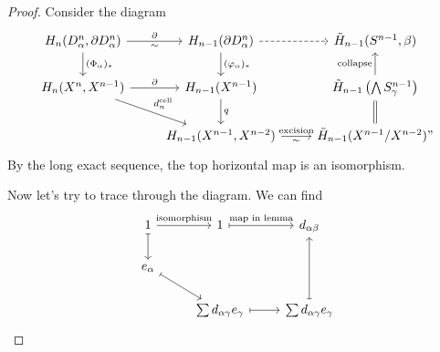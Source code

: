 \documentclass[a4paper]{article}
\begin{document}
\begin{proof}
  Consider the diagram
  \[
    \begin{tikzcd}
      H_n(D_\alpha^n, \partial D_\alpha^n) \ar[d, "(\Phi_\alpha)_*"] \ar[r, "\partial", "\sim"'] & H_{n - 1}(\partial D_\alpha^n)\ar[d, "(\varphi_\alpha)_*"] \ar[r, dashed] & \tilde{H}_{n - 1}(S^{n - 1}, \beta) \\
      H_n(X^n, X^{n - 1}) \ar[r, "\partial"] \ar[rd, "d_n^\mathrm{cell}"] & H_{n - 1}(X^{n - 1}) \ar[d, "q"] & \tilde{H}_{n - 1}\left(\bigwedge S_\gamma^{n - 1}\right)\ar[u, "\text{collapse}"]\\
      & H_{n - 1}(X^{n - 1}, X^{n - 2}) \ar[r, "\text{excision}", "\sim"'] & \tilde{H}_{n - 1}(X^{n - 1}/X^{n - 2})" \ar[u, equals]
    \end{tikzcd}
  \]
  By the long exact sequence, the top horizontal map is an isomorphism.

  Now let's try to trace through the diagram. We can find
  \[
    \begin{tikzcd}
      1 \ar[d, maps to] \ar[r, "\text{isomorphism}"] & 1 \ar[r, maps to, "\text{map in lemma}"]& d_{\alpha\beta}\\
      e_\alpha \ar[rd, maps to]\\
      & \sum d_{\alpha\gamma}e_\gamma \ar[r, maps to] & \sum d_{\alpha\gamma} e_\gamma \ar[uu, maps to]
    \end{tikzcd}
  \]
\end{proof}
\end{document}

